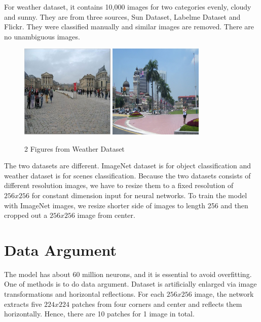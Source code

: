 For weather dataset, it contains 10,000 images for two categories evenly, cloudy and sunny. They are from three sources, Sun Dataset\citep{russell2008labelme}, Labelme Dataset\citep{xiao2010sun} and Flickr. They were classified manually and similar images are removed. There are no unambiguous images.
\graphicspath{ {./Figures/} }
\begin{figure}[!htb]
    \centering
	\includegraphics[width=0.4\textwidth]{cloudy_0001.png}
    \qquad
    \includegraphics[width=0.4\textwidth]{sunny_0003.png}
    \caption{2 Figures from Weather Dataset}%
    \label{fig:WeatherExamples}%
\end{figure}

The two datasets are different. ImageNet dataset is for object classification and weather dataset is for scenes classification. Because the two datasets consists of different resolution images, we have to resize them to a fixed resolution of $256x256$ for constant dimension input for neural networks. To train the model with ImageNet images, we resize shorter side of images to length 256 and then cropped out a $256x256$ image from center.

\section{Data Argument}

The model has about 60 million neurons, and it is essential to avoid overfitting. One of methods is to do data argument. Dataset is artificially enlarged via image transformations and horizontal reflections. For each $256x256$ image, the network extracts five $224x224$ patches from four corners and center and reflects them horizontally. Hence, there are 10 patches for 1 image in total. 

